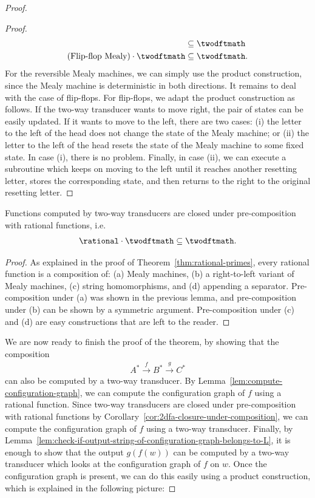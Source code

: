 \begin{proof}
\begin{proof}
\begin{align*}
& \subseteq \twodftmath \\
\text{(Flip-flop Mealy)} \cdot \twodftmath 
& \subseteq \twodftmath.
\end{align*}
For the reversible Mealy machines, we can simply use the product construction, since the Mealy machine is deterministic in both directions. It remains to deal with the case of flip-flops. For flip-flops, we adapt the product construction as follows. If the two-way transducer wants to move right, the pair of states can be easily updated. If it wants to move to the left, there are two cases: (i) the letter to the left of the head does not change the state of the Mealy machine; or (ii) the letter to the left of the head resets the state of the Mealy machine to some fixed state. In case (i), there is no problem. Finally, in case (ii), we can execute a subroutine which keeps on moving to the left until it reaches another resetting letter, stores the corresponding state, and then returns to the right to the original resetting letter.
    \end{proof}

    \begin{corollary}\label{cor:2dfa-closure-under-composition}
        Functions computed by two-way transducers are closed under pre-composition with rational functions, i.e.~
        \begin{align*}        \rational \cdot \twodftmath 
        \subseteq \twodftmath.   
        \end{align*}
    \end{corollary}
    \begin{proof}
        As explained in the proof of Theorem~\ref{thm:rational-primes}, every rational function is a composition of: (a) Mealy machines, (b) a right-to-left variant of Mealy machines, (c) string homomorphisms, and (d) appending a separator. Pre-composition under (a) was shown in the previous lemma, and pre-composition under (b) can be shown by a symmetric argument. Pre-composition under (c) and (d) are easy constructions that are left to the reader. 
    \end{proof}

    We are now ready to finish the proof of the theorem, by showing that the composition 
    \begin{align*}
     A^* \xrightarrow f B^* \xrightarrow g C^*
    \end{align*}
    can also be computed by a two-way transducer. By Lemma~\ref{lem:compute-configuration-graph}, we can compute the configuration graph of $f$ using a rational function. Since two-way transducers are closed under pre-composition with rational functions by Corollary~\ref{cor:2dfa-closure-under-composition}, we can compute the configuration graph of $f$ using a two-way transducer. Finally, by Lemma~\ref{lem:check-if-output-string-of-configuration-graph-belongs-to-L}, it is enough to show that the output $g(f(w))$ can be computed by a two-way transducer which looks at the configuration graph of $f$ on $w$. Once the configuration graph is present, we can do this easily using a product construction, which is explained in the following picture:
\end{proof}
 
